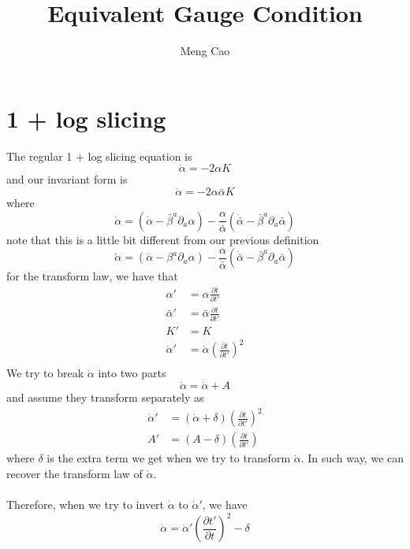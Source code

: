 \documentclass{article}
\begin{document}
\title{Equivalent Gauge Condition}
\author{Meng Cao}
\maketitle

\section{1 + log slicing}
The regular 1 + log slicing equation is
\begin{equation}\label{regular slicing}
{\dot \alpha} = -2\alpha K
\end{equation}
and our invariant form is
\begin{equation}\label{invariant slicing}
\mathring{\alpha} = -2\alpha{\bar \alpha}K
\end{equation}
where
\[
\mathring{\alpha} = ({\dot \alpha} - {\bar \beta}^{a}\partial_{a}\alpha) - \frac{\alpha}{{\bar \alpha}}({\dot {\bar \alpha}} - {\bar \beta}^{a}\partial_{a}{\bar \alpha})
\]
{\color{red} note that this is a little bit different from our previous definition}
{\color{red}
\[
\mathring{\alpha} = ({\dot \alpha} - \beta^{a}\partial_{a}\alpha) - \frac{\alpha}{{\bar \alpha}}({\dot {\bar \alpha}} - {\bar \beta}^{a}\partial_{a}{\bar \alpha})
\]
}
for the transform law, we have that
\begin{align*}
\alpha' & = \alpha\frac{\partial t}{\partial t'}\\
{\bar \alpha}' & = {\bar \alpha}\frac{\partial t}{\partial t'}\\
K' & = K\\
\mathring{\alpha}' & = \mathring{\alpha}\left(\frac{\partial t}{\partial t'}\right)^{2}\\
\end{align*}
We try to break $\mathring{\alpha}$ into two parts
\[
\mathring{\alpha} = {\dot \alpha} + A
\]
and assume they transform separately as
\begin{align*}
{\dot \alpha}' & = ({\dot \alpha} + \delta)\left(\frac{\partial t}{\partial t'}\right)^{2}\\
A' & = (A - \delta)\left(\frac{\partial t}{\partial t'}\right)
\end{align*}
where $\delta$ is the extra term we get when we try to transform ${\dot \alpha}$. In such way, we can recover the transform law of $\mathring{\alpha}$.\\
\\
Therefore, when we try to invert ${\dot \alpha}$ to ${\dot \alpha}'$, we have
\[
{\dot \alpha} = {\dot \alpha}'\left(\frac{\partial t'}{\partial t}\right)^{2} - \delta
\]
\end{document}
